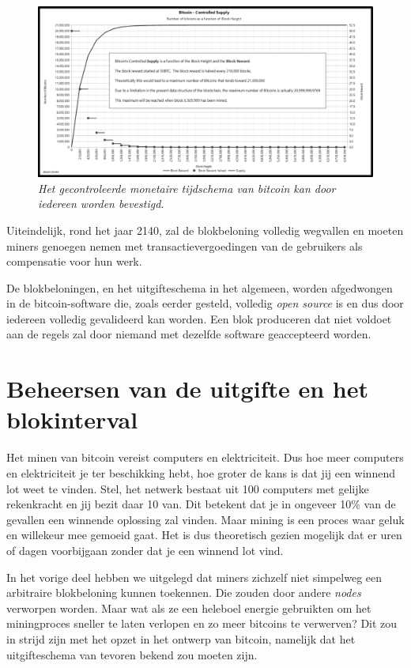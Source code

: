 \begin{figure}
    \centering
    \includegraphics[width=\textwidth]{images/fig6.png}
    \caption{\footnotesize{\textit{Het gecontroleerde monetaire tijdschema van bitcoin kan door iedereen worden bevestigd.}}}
    \label{fig6}
\end{figure}

Uiteindelijk, rond het jaar 2140, zal de blokbeloning volledig wegvallen en moeten miners genoegen nemen met transactievergoedingen van de gebruikers als compensatie voor hun werk.

De blokbeloningen, en het uitgifteschema in het algemeen, worden afgedwongen in de bitcoin-software die, zoals eerder gesteld, volledig \textit{open source} is en dus door iedereen volledig gevalideerd kan worden. Een blok produceren dat niet voldoet aan de regels zal door niemand met dezelfde software geaccepteerd worden.

\section{Beheersen van de uitgifte en het blokinterval}

Het minen van bitcoin vereist computers en elektriciteit. Dus hoe meer computers en elektriciteit je ter beschikking hebt, hoe groter de kans is dat jij een winnend lot weet te vinden. Stel, het netwerk bestaat uit 100 computers met gelijke rekenkracht en jij bezit daar 10 van. Dit betekent dat je in ongeveer 10\% van de gevallen een winnende oplossing zal vinden. Maar mining is een proces waar geluk en willekeur mee gemoeid gaat. Het is dus theoretisch gezien mogelijk dat er uren of dagen voorbijgaan zonder dat je een winnend lot vind.

In het vorige deel hebben we uitgelegd dat miners zichzelf niet simpelweg een arbitraire blokbeloning kunnen toekennen. Die zouden door andere \textit{nodes} verworpen worden. Maar wat als ze een heleboel energie gebruikten om het miningproces sneller te laten verlopen en zo meer bitcoins te verwerven? Dit zou in strijd zijn met het opzet in het ontwerp van bitcoin, namelijk dat het uitgifteschema van tevoren bekend zou moeten zijn.

